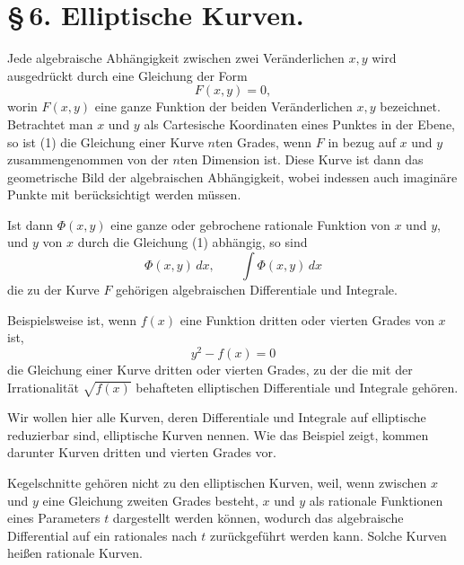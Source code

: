 \documentclass[11pt]{article}
\begin{document}
\section*{\S\,6. Elliptische Kurven.}

Jede algebraische Abhängigkeit zwischen zwei Veränderlichen $x,y$ wird ausgedrückt durch eine Gleichung der Form
\begin{equation}
F(x,y)=0,
\tag{1}
\end{equation}
worin $F(x,y)$ eine ganze Funktion der beiden Veränderlichen $x,y$ bezeichnet. Betrachtet man $x$ und $y$ als Cartesische Koordinaten eines Punktes in der Ebene, so ist (1) die Gleichung einer Kurve $n$ten Grades, wenn $F$ in bezug auf $x$ und $y$ zusammengenommen von der $n$ten Dimension ist. Diese Kurve ist dann das geometrische Bild der algebraischen Abhängigkeit, wobei indessen auch imaginäre Punkte mit berücksichtigt werden müssen.

Ist dann $\Phi(x,y)$ eine ganze oder gebrochene rationale Funktion von $x$ und $y$, und $y$ von $x$ durch die Gleichung (1) abhängig, so sind
\begin{equation}
\Phi(x,y)\,dx,\qquad \int\Phi(x,y)\,dx
\tag{2}
\end{equation}
die zu der Kurve $F$ gehörigen algebraischen Differentiale und Integrale.

Beispielsweise ist, wenn $f(x)$ eine Funktion dritten oder vierten Grades von $x$ ist,
\[
y^2-f(x)=0
\]
die Gleichung einer Kurve dritten oder vierten Grades, zu der die mit der Irrationalität $\sqrt{f(x)}$ behafteten elliptischen Differentiale und Integrale gehören.

Wir wollen hier alle Kurven, deren Differentiale und Integrale auf elliptische reduzierbar sind, elliptische Kurven nennen. Wie das Beispiel zeigt, kommen darunter Kurven dritten und vierten Grades vor.

Kegelschnitte gehören nicht zu den elliptischen Kurven, weil, wenn zwischen $x$ und $y$ eine Gleichung zweiten Grades besteht, $x$ und $y$ als rationale Funktionen eines Parameters $t$ dargestellt werden können, wodurch das algebraische Differential auf ein rationales nach $t$ zurückgeführt werden kann. Solche Kurven heißen rationale Kurven.
\end{document}
